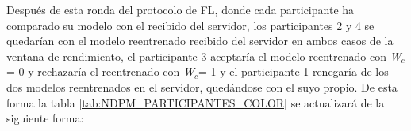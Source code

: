 Después de esta ronda del protocolo de FL, donde cada participante ha comparado su modelo con el recibido del servidor, los participantes 2 y 4 se quedarían con el modelo reentrenado recibido del servidor en ambos casos de la ventana de rendimiento, el participante 3 aceptaría el modelo reentrenado con \textit{W$_c$}= 0 y rechazaría el reentrenado con \textit{W$_c$}= 1 y el participante 1 renegaría de los dos modelos reentrenados en el servidor, quedándose con el suyo propio. De esta forma la tabla \ref{tab:NDPM_PARTICIPANTES_COLOR} se actualizará de la siguiente forma:
{
    \let\OldTabular\tabular%
    \let\OldEndTabular\endtabular%
    \renewenvironment{tabular}{\StartTableHeader\OldTabular}{\OldEndTabular\StartTableHeader}%

    \newcommand*{\MinNumber}{0.125}%
    \newcommand*{\MidNumber}{0.165} %
    \newcommand*{\MaxNumber}{0.205}%

    \newcommand{\ApplyGradient}[1]{%
    \iftoggle{inTableHeader}{#1}{
        \ifdim #1 pt > \MidNumber pt
            \pgfmathsetmacro{\PercentColor}{max(min(100.0*(#1 - \MidNumber)/(\MaxNumber-\MidNumber),100.0),0.00)} %
            \hspace{-0.33em}\colorbox{red!\PercentColor!yellow}{#1}
        \else
            \pgfmathsetmacro{\PercentColor}{max(min(100.0*(\MidNumber - #1)/(\MidNumber-\MinNumber),100.0),0.00)} %
            \hspace{-0.33em}\colorbox{green!\PercentColor!yellow}{#1}
        \fi
    }}

    \renewcommand{\arraystretch}{0}
    \setlength{\fboxsep}{3mm} %
    \setlength{\tabcolsep}{0pt}


}
